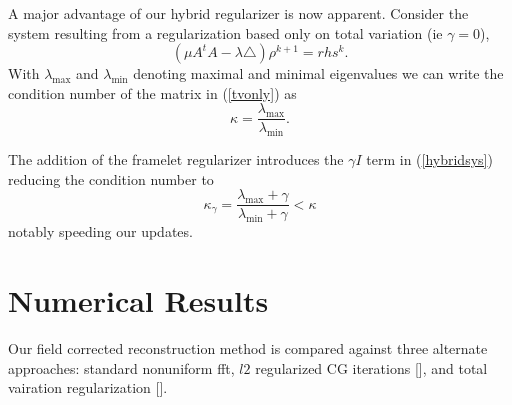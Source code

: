 \documentclass[11pt]{amsart}
\theoremstyle{remark}
\begin{document}
A major advantage of our hybrid regularizer is now apparent. Consider the system resulting from a regularization based only on total variation (ie $\gamma =0$),
\begin{equation}\label{tvonly}
(\mu A^tA - \lambda \triangle)\rho^{k+1} = rhs^k.
\end{equation}
With $\lambda_{\max}$ and $\lambda_{\min}$ denoting maximal and minimal eigenvalues we can write the condition number of the matrix in (\ref{tvonly}) as
\begin{equation}
\kappa = \frac{\lambda_{\max}}{\lambda_{\min}}.
\end{equation}

The addition of the framelet regularizer introduces the $\gamma I$ term in (\ref{hybridsys}) reducing the condition number to
\begin{equation}
\kappa_\gamma  =  \frac{\lambda_{\max} + \gamma}{\lambda_{\min} + \gamma} < \kappa
\end{equation}
notably speeding our updates.

\section{Numerical Results}

Our field corrected reconstruction method is compared against three alternate approaches: standard nonuniform fft, $l2$ regularized CG iterations [], and total vairation regularization [].







\end{document}
